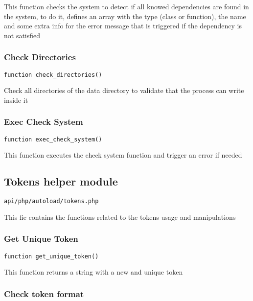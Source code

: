 \documentclass[a4paper]{article}
\begin{document}
This function checks the system to detect if all knowed dependencies are found in the system, to do it,
defines an array with the type (class or function), the name and some extra info for the error message
that is triggered if the dependency is not satisfied

\hypertarget{toc256}{}
\subsubsection{Check Directories}

\begin{lstlisting}
function check_directories()
\end{lstlisting}

Check all directories of the data directory to validate that the process can write inside it

\hypertarget{toc257}{}
\subsubsection{Exec Check System}

\begin{lstlisting}
function exec_check_system()
\end{lstlisting}

This function executes the check system function and trigger an error if needed

\hypertarget{toc258}{}
\subsection{Tokens helper module}

\begin{lstlisting}
api/php/autoload/tokens.php
\end{lstlisting}

This fie contains the functions related to the tokens usage and manipulations

\hypertarget{toc259}{}
\subsubsection{Get Unique Token}

\begin{lstlisting}
function get_unique_token()
\end{lstlisting}

This function returns a string with a new and unique token

\hypertarget{toc260}{}
\subsubsection{Check token format}
\end{document}
